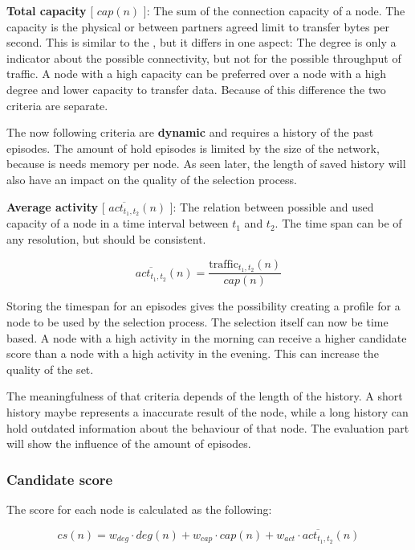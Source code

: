 \documentclass[thesis.tex]{subfiles}
\begin{document}
\textbf{Total capacity} [ $cap(n)$ ]: The sum of the connection capacity of a node. The capacity is the physical or between partners agreed limit to transfer bytes per second. This is similar to the , but it differs in one aspect: The degree is only a indicator about the possible connectivity, but not for the possible throughput of traffic. A node with a high capacity can be preferred over a node with a high degree and lower capacity to transfer data. Because of this difference the two criteria are separate.

The now following criteria are \textbf{dynamic} and requires a history of the past episodes. The amount of hold episodes is limited by the size of the network, because is needs memory per node. As seen later, the length of saved history will also have an impact on the quality of the selection process.

\textbf{Average activity} [ $\overline{act_{t_1,t_2}}(n)$ ]: The relation between possible and used capacity of a node in a time interval between $t_1$ and $t_2$. The time span can be of any resolution, but should be consistent. 

\begin{equation}
\overline{act_{t_1,t_2}}(n) = \frac{\text{traffic}_{t_1,t_2}(n)}{cap(n)}
\end{equation}

Storing the timespan for an episodes gives the possibility creating a profile for a node to be used by the selection process. The selection itself can now be time based. A node with a high activity in the morning can receive a higher candidate score than a node with a high activity in the evening. This can increase the quality of the set.

The meaningfulness of that criteria depends of the length of the history. A short history maybe represents a inaccurate result of the node, while a long history can hold outdated information about the behaviour of that node. The evaluation part will show the influence of the amount of episodes.

\subsubsection{Candidate score}

The score for each node is calculated as the following:

\begin{equation} \label{equo:candidateScore}
cs(n) = w_{deg}\cdot deg(n) + w_{cap}\cdot cap(n) + w_{act}\cdot \overline{act_{t_1,t_2}}(n)
\end{equation}
\end{document}
